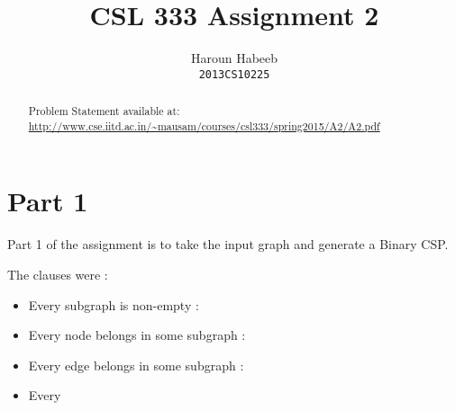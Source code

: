 \documentclass[]{article}
\begin{document}
\author{
  Haroun Habeeb\\
  \texttt{2013CS10225}
}
\title{CSL 333 Assignment 2}
\maketitle

\begin{abstract}
Problem Statement available at: \url{http://www.cse.iitd.ac.in/~mausam/courses/csl333/spring2015/A2/A2.pdf}
\end{abstract}

\section{Part 1}
Part 1 of the assignment is to take the input graph and generate a Binary CSP.

The clauses were :
\begin{itemize}
\item Every subgraph is non-empty :
\item Every node belongs in some subgraph : 
\item Every edge belongs in some subgraph :
\item Every 
\end{itemize}
\end{document}
